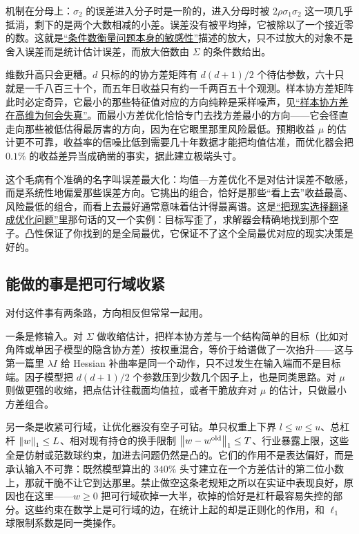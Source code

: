机制在分母上：\(\sigma_2\) 的误差进入分子时是一阶的，进入分母时被 \(2\rho\sigma_1\sigma_2\) 这一项几乎抵消，剩下的是两个大数相减的小差。误差没有被平均掉，它被除以了一个接近零的数。这就是\hyperref[sec:08-Numerical-Analysis/01-Floating-Point-and-Error/03]{``条件数衡量问题本身的敏感性''}描述的放大，只不过放大的对象不是舍入误差而是统计估计误差，而放大倍数由 \(\Sigma\) 的条件数给出。

维数升高只会更糟。\(d\) 只标的的协方差矩阵有 \(d(d+1)/2\) 个待估参数，六十只就是一千八百三十个，而五年日收益只有约一千两百五十个观测。样本协方差矩阵此时必定奇异，它最小的那些特征值对应的方向纯粹是采样噪声，见\hyperref[sec:11-Mathematical-Statistics/09-Random-Matrix-Theory/01]{``样本协方差在高维为何会失真''}。而最小方差优化恰恰专门去找方差最小的方向——它会径直走向那些被低估得最厉害的方向，因为在它眼里那里风险最低。预期收益 \(\mu\) 的估计更不可靠，收益率的信噪比低到需要几十年数据才能把均值估准，而优化器会把 \(0.1\%\) 的收益差异当成确凿的事实，据此建立极端头寸。

这个毛病有个准确的名字叫误差最大化：均值---方差优化不是对估计误差不敏感，而是系统性地偏爱那些误差方向。它挑出的组合，恰好是那些``看上去''收益最高、风险最低的组合，而看上去最好通常意味着估计得最离谱。这是\hyperref[sec:09-Convex-Optimization/01-Optimization-Foundations/01]{``把现实选择翻译成优化问题''}里那句话的又一个实例：目标写歪了，求解器会精确地找到那个空子。凸性保证了你找到的是全局最优，它保证不了这个全局最优对应的现实决策是好的。

\subsection{能做的事是把可行域收紧}

对付这件事有两条路，方向相反但常常一起用。

一条是修输入。对 \(\Sigma\) 做收缩估计，把样本协方差与一个结构简单的目标（比如对角阵或单因子模型的隐含协方差）按权重混合，等价于给谱做了一次抬升——这与第一篇里 \(\lambda I\) 给 Hessian 补曲率是同一个动作，只不过发生在输入端而不是目标端。因子模型把 \(d(d+1)/2\) 个参数压到少数几个因子上，也是同类思路。对 \(\mu\) 则做更强的收缩，把点估计往截面均值拉，或者干脆放弃对 \(\mu\) 的估计，只做最小方差组合。

另一条是收紧可行域，让优化器没有空子可钻。单只权重上下界 \(l\le w\le u\)、总杠杆 \(\left\lVert w\right\rVert_1\le L\)、相对现有持仓的换手限制 \(\left\lVert w-w^{\text{old}}\right\rVert_1\le T\)、行业暴露上限，这些全是仿射或范数球约束，加进去问题仍然是凸的。它们的作用不是表达偏好，而是承认输入不可靠：既然模型算出的 \(340\%\) 头寸建立在一个方差估计的第二位小数上，那就干脆不让它到达那里。禁止做空这条老规矩之所以在实证中表现良好，原因也在这里——\(w\ge0\) 把可行域砍掉一大半，砍掉的恰好是杠杆最容易失控的部分。这些约束在数学上是可行域的边，在统计上起的却是正则化的作用，和 \(\ell_1\) 球限制系数是同一类操作。


